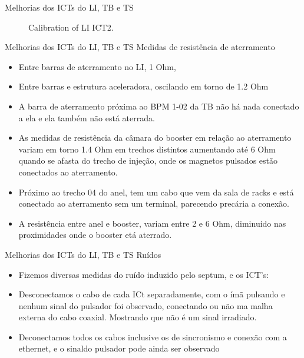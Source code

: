 \documentclass[aspectratio=169]{beamer}            %
\begin{document}
\begin{frame}{Melhorias dos ICTs do LI, TB e TS}
\begin{figure}[ht]
\begin{minipage}[b]{0.45\linewidth}
        \caption{Calibration of LI ICT2.}
        \label{fig:b}
    \end{minipage}
\end{figure}
\end{frame}

\begin{frame}{Melhorias dos ICTs do LI, TB e TS}
\vspace{0.2cm}
Medidas de resistência de aterramento
\vspace{0.2cm}
{\footnotesize
\begin{itemize}
    \setlength\itemsep{1em}
    \item Entre barras de aterramento no LI, 1 Ohm,
    \item Entre barras e estrutura aceleradora, oscilando em torno de 1.2 Ohm
    \item A barra de aterramento próxima ao BPM 1-02 da TB não há nada conectado a ela e ela também não está aterrada.
    \item As medidas de resistência da câmara do booster em relação ao aterramento variam em torno 1.4 Ohm em trechos distintos 
aumentando até 6 Ohm quando se afasta do trecho de injeção, onde os magnetos pulsados estão conectados ao aterramento.
    \item Próximo ao trecho 04 do anel, tem um cabo que vem da sala de racks e está conectado ao aterramento sem um terminal, parecendo
    precária a conexão.
    \item A resistência entre anel e booster, variam entre 2 e 6 Ohm, diminuido nas proximidades onde o booster etá aterrado.
\end{itemize}
}
\end{frame}

\begin{frame}{Melhorias dos ICTs do LI, TB e TS}
\vspace{0.2cm}
Ruídos
\vspace{0.2cm}
\begin{itemize}
    \setlength\itemsep{1em}
    \item Fizemos diversas medidas do ruído induzido pelo septum, e os ICT's:
    \item Desconectamos o cabo de cada ICt separadamente, com o ímã pulsando e nenhum sinal do pulsador foi observado, conectando
    ou não ma malha externa do cabo coaxial. Mostrando que não é um sinal irradiado.
     \item Deconectamos todos os cabos inclusive os de sincronismo e conexão com a ethernet, e o sinaldo pulsador pode ainda ser observado
\end{itemize}
\end{frame}
\end{document}
